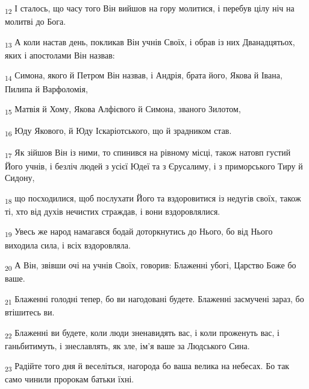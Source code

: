 \begin{tcolorbox}
\textsubscript{12} І сталось, що часу того Він вийшов на гору молитися, і перебув цілу ніч на молитві до Бога.
\end{tcolorbox}
\begin{tcolorbox}
\textsubscript{13} А коли настав день, покликав Він учнів Своїх, і обрав із них Дванадцятьох, яких і апостолами Він назвав:
\end{tcolorbox}
\begin{tcolorbox}
\textsubscript{14} Симона, якого й Петром Він назвав, і Андрія, брата його, Якова й Івана, Пилипа й Варфоломія,
\end{tcolorbox}
\begin{tcolorbox}
\textsubscript{15} Матвія й Хому, Якова Алфієвого й Симона, званого Зилотом,
\end{tcolorbox}
\begin{tcolorbox}
\textsubscript{16} Юду Якового, й Юду Іскаріотського, що й зрадником став.
\end{tcolorbox}
\begin{tcolorbox}
\textsubscript{17} Як зійшов Він із ними, то спинився на рівному місці, також натовп густий Його учнів, і безліч людей з усієї Юдеї та з Єрусалиму, і з приморського Тиру й Сидону,
\end{tcolorbox}
\begin{tcolorbox}
\textsubscript{18} що посходилися, щоб послухати Його та вздоровитися із недугів своїх, також ті, хто від духів нечистих страждав, і вони вздоровлялися.
\end{tcolorbox}
\begin{tcolorbox}
\textsubscript{19} Увесь же народ намагався бодай доторкнутись до Нього, бо від Нього виходила сила, і всіх вздоровляла.
\end{tcolorbox}
\begin{tcolorbox}
\textsubscript{20} А Він, звівши очі на учнів Своїх, говорив: Блаженні убогі, Царство Боже бо ваше.
\end{tcolorbox}
\begin{tcolorbox}
\textsubscript{21} Блаженні голодні тепер, бо ви нагодовані будете. Блаженні засмучені зараз, бо втішитесь ви.
\end{tcolorbox}
\begin{tcolorbox}
\textsubscript{22} Блаженні ви будете, коли люди зненавидять вас, і коли проженуть вас, і ганьбитимуть, і знеславлять, як зле, ім'я ваше за Людського Сина.
\end{tcolorbox}
\begin{tcolorbox}
\textsubscript{23} Радійте того дня й веселіться, нагорода бо ваша велика на небесах. Бо так само чинили пророкам батьки їхні.
\end{tcolorbox}
